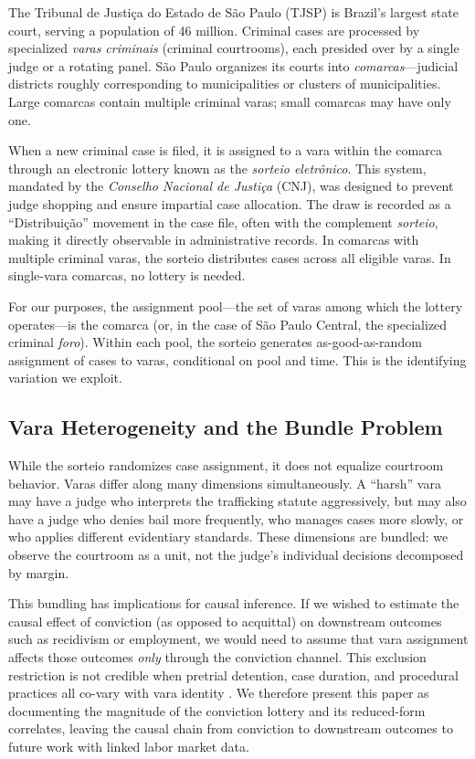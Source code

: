 \documentclass[12pt]{article}
\begin{document}
The Tribunal de Justi\c{c}a do Estado de S\~ao Paulo (TJSP) is Brazil's largest state court, serving a population of 46 million. Criminal cases are processed by specialized \textit{varas criminais} (criminal courtrooms), each presided over by a single judge or a rotating panel. S\~ao Paulo organizes its courts into \textit{comarcas}---judicial districts roughly corresponding to municipalities or clusters of municipalities. Large comarcas contain multiple criminal varas; small comarcas may have only one.

When a new criminal case is filed, it is assigned to a vara within the comarca through an electronic lottery known as the \textit{sorteio eletr\^onico}. This system, mandated by the \textit{Conselho Nacional de Justi\c{c}a} (CNJ), was designed to prevent judge shopping and ensure impartial case allocation. The draw is recorded as a ``Distribui\c{c}\~ao'' movement in the case file, often with the complement \textit{sorteio}, making it directly observable in administrative records. In comarcas with multiple criminal varas, the sorteio distributes cases across all eligible varas. In single-vara comarcas, no lottery is needed.

For our purposes, the assignment pool---the set of varas among which the lottery operates---is the comarca (or, in the case of S\~ao Paulo Central, the specialized criminal \textit{foro}). Within each pool, the sorteio generates as-good-as-random assignment of cases to varas, conditional on pool and time. This is the identifying variation we exploit.

\subsection{Vara Heterogeneity and the Bundle Problem}

While the sorteio randomizes case assignment, it does not equalize courtroom behavior. Varas differ along many dimensions simultaneously. A ``harsh'' vara may have a judge who interprets the trafficking statute aggressively, but may also have a judge who denies bail more frequently, who manages cases more slowly, or who applies different evidentiary standards. These dimensions are bundled: we observe the courtroom as a unit, not the judge's individual decisions decomposed by margin.

This bundling has implications for causal inference. If we wished to estimate the causal effect of conviction (as opposed to acquittal) on downstream outcomes such as recidivism or employment, we would need to assume that vara assignment affects those outcomes \textit{only} through the conviction channel. This exclusion restriction is not credible when pretrial detention, case duration, and procedural practices all co-vary with vara identity \citep{hull2025}. We therefore present this paper as documenting the magnitude of the conviction lottery and its reduced-form correlates, leaving the causal chain from conviction to downstream outcomes to future work with linked labor market data.
\end{document}
